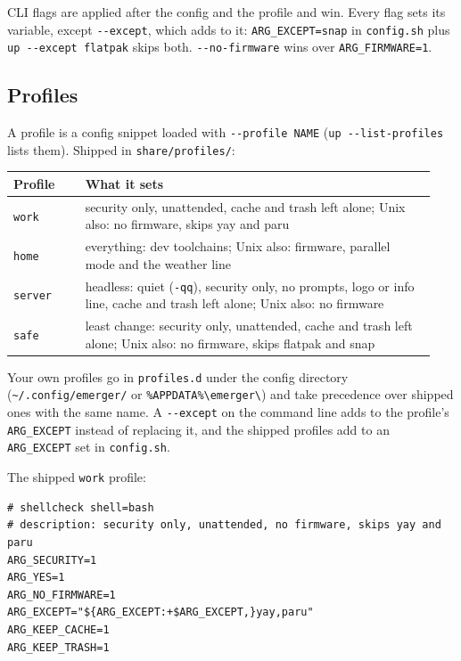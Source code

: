 \documentclass[11pt,a4paper]{article}
\begin{document}
CLI flags are applied after the config and the profile and win. Every flag
sets its variable, except \texttt{-{}-except}, which adds to it:
\verb|ARG_EXCEPT=snap| in \texttt{config.sh} plus
\texttt{up -{}-except flatpak} skips both. \texttt{-{}-no-firmware} wins
over \verb|ARG_FIRMWARE=1|.

\subsection{Profiles}\label{sec:profiles}
A profile is a config snippet loaded with \texttt{-{}-profile NAME}
(\texttt{up -{}-list-profiles} lists them). Shipped in
\texttt{share/profiles/}:

\begin{center}
\begin{tabular}{@{}p{0.16\linewidth} p{0.78\linewidth}@{}}
\toprule
\textbf{Profile} & \textbf{What it sets} \\
\midrule
\texttt{work}   & security only, unattended, cache and trash
                  left alone; Unix also: no firmware, skips yay and paru \\
\texttt{home}   & everything: dev toolchains; Unix also: firmware,
                  parallel mode and the weather line \\
\texttt{server} & headless: quiet (\texttt{-qq}), security only, no prompts,
                  logo or info line, cache and trash left alone; Unix also:
                  no firmware \\
\texttt{safe}   & least change: security only, unattended,
                  cache and trash left alone; Unix also: no firmware, skips
                  flatpak and snap \\
\bottomrule
\end{tabular}
\end{center}

Your own profiles go in \verb|profiles.d| under the config directory
(\verb|~/.config/emerger/| or \verb|%APPDATA%\emerger\|) and take
precedence over shipped ones with the same name. A \texttt{-{}-except} on the command line
adds to the profile's \texttt{ARG\_EXCEPT} instead of replacing it, and the
shipped profiles add to an \texttt{ARG\_EXCEPT} set in \verb|config.sh|.

The shipped \texttt{work} profile:

\begin{lstlisting}[language=bashplus]
# shellcheck shell=bash
# description: security only, unattended, no firmware, skips yay and paru
ARG_SECURITY=1
ARG_YES=1
ARG_NO_FIRMWARE=1
ARG_EXCEPT="${ARG_EXCEPT:+$ARG_EXCEPT,}yay,paru"
ARG_KEEP_CACHE=1
ARG_KEEP_TRASH=1
\end{lstlisting}
\end{document}
